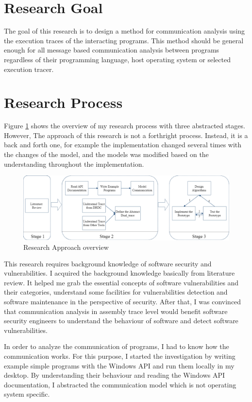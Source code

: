 \section{Research Goal}
The goal of this research is to design a method for communication analysis using the execution traces of the interacting programs. This method should be general enough for all message based communication analysis between programs regardless of their programming language, host operating system or selected execution tracer. 

\section{Research Process}
Figure \ref{methodology} shows the overview of my research process with three abstracted stages. However, The approach of this research is not a forthright process. Instead, it is a back and forth one, for example the implementation changed several times with the changes of the model, and the models was modified based on the understanding throughout the implementation. 

\begin{figure}[H]
  \centerline{\includegraphics[scale=0.45]{Figures/methodology}}
  \caption{Research Approach overview}
  \label{methodology}
  \end{figure}

This research requires background knowledge of software security and vulnerabilities. I acquired the background knowledge basically from literature review. It helped me grab the essential concepts of software vulnerabilities and their categories, understand some facilities for vulnerabilities detection and software maintenance in the perspective of security. After that, I was convinced that communication analysis in assembly trace level would benefit software security engineers to understand the behaviour of software and detect software vulnerabilities. 

In order to analyze the communication of programs, I had to know how the communication works. For this purpose, I started the investigation by writing example simple programs with the Windows API and run them locally in my desktop. By understanding their behaviour and reading the Windows API documentation, I abstracted the communication model which is not operating system specific.

